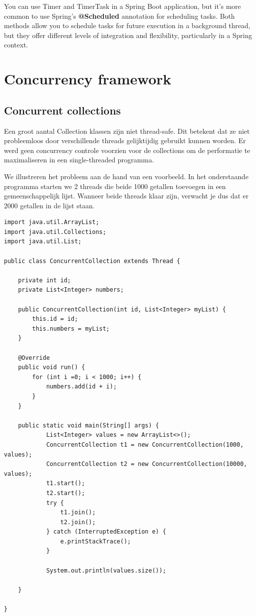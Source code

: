 You can use Timer and TimerTask in a Spring Boot application, but it's more common to use Spring's \textbf{@Scheduled} annotation for scheduling tasks. Both methods allow you to schedule tasks for future execution in a background thread, but they offer different levels of integration and flexibility, particularly in a Spring context.

\section{Concurrency framework}

\subsection{Concurrent collections}

Een groot aantal Collection klassen zijn niet thread-safe. Dit betekent dat ze niet probleemloos door verschillende threads gelijktijdig gebruikt kunnen worden.
Er werd geen concurrency controle voorzien voor de collections om de performatie te maximaliseren in een single-threaded programma.

We illustreren het probleem aan de hand van een voorbeeld. In het onderstaande programma starten we 2 threads die beide 1000 getallen toevoegen in een gemeenschappelijk lijst. Wanneer beide threads klaar zijn, verwacht je dus dat er 2000 getallen in de lijst staan. 

\begin{lstlisting}
import java.util.ArrayList;
import java.util.Collections;
import java.util.List;

public class ConcurrentCollection extends Thread {

	private int id;
	private List<Integer> numbers;

	public ConcurrentCollection(int id, List<Integer> myList) {
		this.id = id;
		this.numbers = myList;
	}

	@Override
	public void run() {
		for (int i =0; i < 1000; i++) {
			numbers.add(id + i);
		}
	}

	public static void main(String[] args) {
			List<Integer> values = new ArrayList<>();
			ConcurrentCollection t1 = new ConcurrentCollection(1000, values);
			ConcurrentCollection t2 = new ConcurrentCollection(10000, values);
			t1.start();
			t2.start();
			try {
				t1.join();
				t2.join();
			} catch (InterruptedException e) {
				e.printStackTrace();
			}

			System.out.println(values.size());

	}

}
\end{lstlisting}

